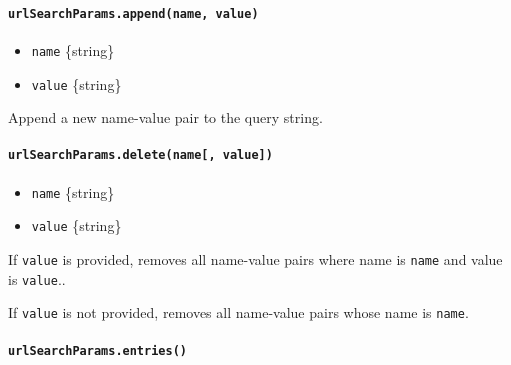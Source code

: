 \begin{Shaded}
\begin{Highlighting}[]
 \NormalTok{([}
\NormalTok{  [}\OperatorTok{,} \OperatorTok{,} \NormalTok{]}\OperatorTok{,}
\NormalTok{])}\OperatorTok{;}
\end{Highlighting}
\end{Shaded}

\paragraph{\texorpdfstring{\texttt{urlSearchParams.append(name,\ value)}}{urlSearchParams.append(name, value)}}\label{urlsearchparams.appendname-value}

\begin{itemize}
\tightlist
\item
  \texttt{name} \{string\}
\item
  \texttt{value} \{string\}
\end{itemize}

Append a new name-value pair to the query string.

\paragraph{\texorpdfstring{\texttt{urlSearchParams.delete(name{[},\ value{]})}}{urlSearchParams.delete(name{[}, value{]})}}\label{urlsearchparams.deletename-value}

\begin{itemize}
\tightlist
\item
  \texttt{name} \{string\}
\item
  \texttt{value} \{string\}
\end{itemize}

If \texttt{value} is provided, removes all name-value pairs where name
is \texttt{name} and value is \texttt{value}..

If \texttt{value} is not provided, removes all name-value pairs whose
name is \texttt{name}.

\paragraph{\texorpdfstring{\texttt{urlSearchParams.entries()}}{urlSearchParams.entries()}}\label{urlsearchparams.entries}

